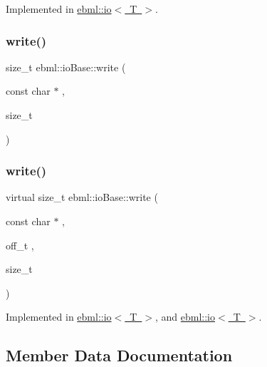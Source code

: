 Implemented in \mbox{\hyperlink{classebml_1_1io_a9a50a99136e7e9a4a404dc3087024a7f}{ebml\+::io$<$ T $>$}}.

\mbox{\label{classebml_1_1ioBase_a3895c5e0f86ecdcedaa288e87d68ccad}} 
\subsubsection{\texorpdfstring{write()}{write()}\hspace{0.1cm}{\footnotesize\ttfamily [1/2]}}
{\footnotesize\ttfamily size\+\_\+t ebml\+::io\+Base\+::write (\begin{DoxyParamCaption}\item[{const char $\ast$}]{,  }\item[{size\+\_\+t}]{ }\end{DoxyParamCaption})}

\mbox{\label{classebml_1_1ioBase_ad4a000de5db86375be0bf338130f76c9}} 
\subsubsection{\texorpdfstring{write()}{write()}\hspace{0.1cm}{\footnotesize\ttfamily [2/2]}}
{\footnotesize\ttfamily virtual size\+\_\+t ebml\+::io\+Base\+::write (\begin{DoxyParamCaption}\item[{const char $\ast$}]{,  }\item[{off\+\_\+t}]{,  }\item[{size\+\_\+t}]{ }\end{DoxyParamCaption})\hspace{0.3cm}{\ttfamily [pure virtual]}}



Implemented in \mbox{\hyperlink{classebml_1_1io_a5c3f2df6edfbd090b4d0fbc8a6dacccb}{ebml\+::io$<$ T $>$}}, and \mbox{\hyperlink{classebml_1_1io_aedbdf5a69ee0ae64f909a59645cd0db7}{ebml\+::io$<$ T $>$}}.



\subsection{Member Data Documentation}
\mbox{\label{classebml_1_1ioBase_a0083c31349d480a5e3b83dd366c22144}} 
